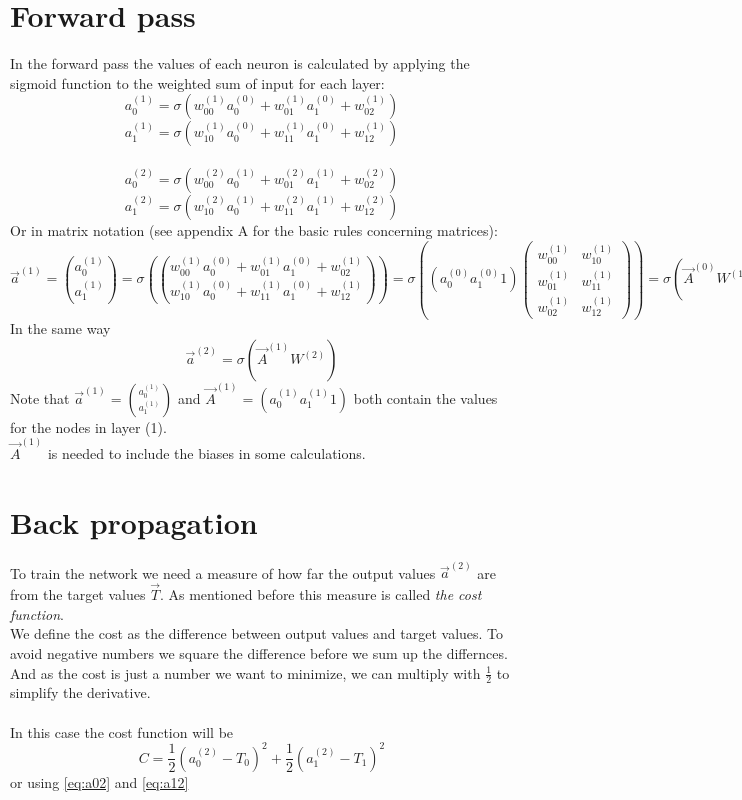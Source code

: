 \documentclass{article}
\begin{document}
\section*{Forward pass}
In the forward pass the values of each neuron is calculated by applying the sigmoid function to the weighted sum of input for each layer:
\\
\begin{equation} \label{eq:a01}
a_0^{(1)} = \sigma(w_{00}^{(1)}a_0^{(0)}+w_{01}^{(1)}a_1^{(0)}+w_{02}^{(1)})
\end{equation}
\begin{equation} \label{eq:a11}
a_1^{(1)} = \sigma(w_{10}^{(1)}a_0^{(0)}+w_{11}^{(1)}a_1^{(0)}+w_{12}^{(1)})
\end{equation}
\\
\begin{equation} \label{eq:a02}
a_0^{(2)} = \sigma(w_{00}^{(2)}a_0^{(1)}+w_{01}^{(2)}a_1^{(1)}+w_{02}^{(2)})
\end{equation}
\begin{equation} \label{eq:a12}
a_1^{(2)} = \sigma(w_{10}^{(2)}a_0^{(1)}+w_{11}^{(2)}a_1^{(1)}+w_{12}^{(2)})
\end{equation}
Or in matrix notation (see appendix A for the basic rules concerning matrices):
\[
\vec a^{(1)} = 
\binom{a_0^{(1)}}{a_1^{(1)}} =
\sigma \left ( \binom{w_{00}^{(1)}a_0^{(0)}+w_{01}^{(1)}a_1^{(0)}+w_{02}^{(1)}}{w_{10}^{(1)}a_0^{(0)}+w_{11}^{(1)}a_1^{(0)}+w_{12}^{(1)}} \right ) 
= \sigma\left((a_0^{(0)} a_1^{(0)} 1)
\begin{pmatrix}
w_{00}^{(1)} & w_{10}^{(1)} \\
w_{01}^{(1)} & w_{11}^{(1)} \\
 w_{02}^{(1)} & w_{12}^{(1)}
\end{pmatrix}\right)
= \sigma(\vec A^{(0)}W^{(1)}) 
\]
In the same way
\[
\vec a^{(2)} = \sigma(\vec A^{(1)}W^{(2)})
\]
Note that $\vec a^{(1)} = \binom{a_0^{(1)}}{a_1^{(1)}}$ and $\vec A^{(1)} = (a_0^{(1)} a_1^{(1)} 1)$ both contain the values for the nodes in layer (1).
\\
$\vec A^{(1)}$ is needed to include the biases in some calculations.
\\
\section*{Back propagation}
To train the network we need a measure of how far the output values $\vec a^{(2)}$ are from the target values $\vec T$. As mentioned before this measure is called \textit{the cost function}.
\\ 
We define the cost as the difference between output values and target values. To avoid negative numbers we square the difference before we sum up the differnces.
\\
And as the cost is just a number we want to minimize, we can multiply with $\frac{1}{2}$ to simplify the derivative.
\\
\\
In this case the cost function will be $$ C = \frac {1}{2}(a_0^{(2)}-T_0)^2 + \frac {1}{2}(a_1^{(2)}-T_1)^2 $$
or using \eqref{eq:a02} and \eqref{eq:a12}
\end{document}
